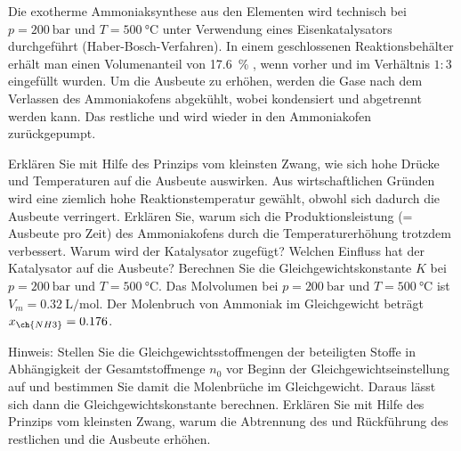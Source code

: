 \documentclass[DIV11]{scrartcl}
\begin{document}
\bigskip

\begin{question}[name=Technische Ammoniaksynthese,ID=tech:NH3]
Die exotherme Ammoniaksynthese aus den Elementen wird technisch bei $p =
\SI{200}{\bar}$ und $T = \SI{500}{\celsius}$ unter Verwendung eines
Eisenkatalysators durchgeführt (Haber-Bosch-Verfahren).  In einem
geschlossenen Reaktionsbehälter erhält man einen Volumenanteil von
\SI{17.6}{\percent} , wenn vorher  und  im Verhältnis
$1:3$ eingefüllt wurden.  Um die Ausbeute zu erhöhen, werden die Gase nach
dem Verlassen des Ammoniakofens abgekühlt, wobei  kondensiert und
abgetrennt werden kann.  Das restliche  und  wird wieder in den
Ammoniakofen zurückgepumpt.
\begin{tasks}
  \task Erklären Sie mit Hilfe des Prinzips vom kleinsten Zwang, wie sich hohe
    Drücke und Temperaturen auf die Ausbeute auswirken.
  \task Aus wirtschaftlichen Gründen wird eine ziemlich hohe
    Reaktionstemperatur gewählt, obwohl sich dadurch die Ausbeute verringert.
    Erklären Sie, warum sich die Produktionsleistung (= Ausbeute pro Zeit) des
    Ammoniakofens durch die Temperaturerhöhung trotzdem verbessert.
  \task Warum wird der Katalysator zugefügt?  Welchen Einfluss hat der
    Katalysator auf die Ausbeute?
  \task Berechnen Sie die Gleichgewichtskonstante $K$ bei $p = \SI{200}{\bar}$
    und $T = \SI{500}{\celsius}$.  Das Molvolumen bei $p = \SI{200}{\bar}$ und
    $T = \SI{500}{\celsius}$ ist $V_m = \SI{0.32}{\liter\per\mole}$. Der
    Molenbruch von Ammoniak im Gleichgewicht beträgt $x_{\ch{NH3}}=0.176$.
    
    Hinweis: Stellen Sie die Gleichgewichtsstoffmengen der beteiligten Stoffe
    in Abhängigkeit der Gesamtstoffmenge $n_0$ vor Beginn der
    Gleichgewichtseinstellung auf und bestimmen Sie damit die Molenbrüche im
    Gleichgewicht.  Daraus lässt sich dann die Gleichgewichtskonstante
    berechnen.
  \task Erklären Sie mit Hilfe des Prinzips vom kleinsten Zwang, warum die
    Abtrennung des  und Rückführung des restlichen  und 
    die Ausbeute erhöhen.
\end{tasks}
\end{question}
\end{document}
